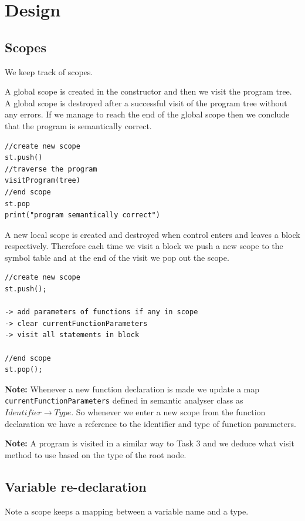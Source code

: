 \section{Design}
\label{sec:design semantic}
\subsection{Scopes}
We  keep track of scopes. 


A global scope is created in the constructor and then we visit the program tree. A global scope is destroyed after a  successful visit  of the program tree without any errors. If we manage to reach the end of the global scope then we conclude that the program is semantically correct.
\begin{lstlisting}[caption=PSEUDOCODE : constructor (start of program traversal)]
//create new scope 
st.push()
//traverse the program
visitProgram(tree)
//end scope
st.pop
print("program semantically correct")
\end{lstlisting}

A new local scope is created  and destroyed when control enters and leaves a block respectively. Therefore each time we visit a block we push a new scope to the symbol table and at the end of the visit we pop out the scope.
\begin{lstlisting}[caption=PSEUDOCODE : \emph{visitBlockNode(Tree tree)}]
//create new scope
st.push();

-> add parameters of functions if any in scope
-> clear currentFunctionParameters
-> visit all statements in block

//end scope
st.pop();
\end{lstlisting}

\textbf{Note:} Whenever a new function declaration is made we update a map  \verb!currentFunctionParameters! defined in semantic analyser class as $Identifier \rightarrow Type$. So whenever we enter a new scope from the function declaration we have a reference to the identifier and type of function parameters.

\textbf{Note:} A program is visited in a similar way to Task 3 and we  deduce what visit method to use based on the  type of the root node. 


\subsection{Variable re-declaration}
Note a scope keeps a mapping between a variable name and a type. 






